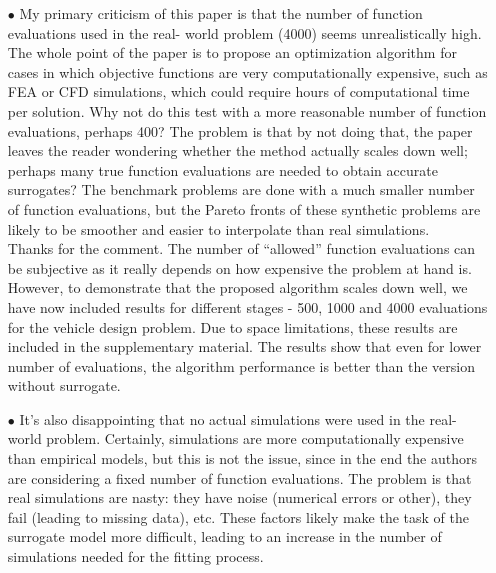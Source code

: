 \documentclass[onecolumn,10pt]{asme2ej}
\begin{document}
\begin{itemize}

\item[$\bullet$]	My primary criticism of this paper is that the number of function evaluations used in the real- world problem (4000) seems unrealistically high. The whole point of the paper is to propose an optimization algorithm for cases in which objective functions are very computationally expensive, such as FEA or CFD simulations, which could require hours of computational time per solution. Why not do this test with a more reasonable number of function evaluations, perhaps 400? The problem is that by not doing that, the paper leaves the reader wondering whether the method actually scales down well; perhaps many true function evaluations are needed to obtain accurate surrogates? The benchmark problems are done with a much smaller number of function evaluations, but the Pareto fronts of these synthetic problems are likely to be smoother and easier to interpolate than real simulations. \\

{\color{blue} Thanks for the comment. The number of ``allowed'' function evaluations  can be subjective as it really depends on how expensive the problem at hand is. However, to demonstrate that the proposed algorithm scales down well, we have now included results for different stages - 500, 1000 and 4000 evaluations for the vehicle design problem. Due to space limitations, these results are included in the supplementary material. The results show that even for lower number of evaluations, the algorithm performance is better than the version without surrogate. 
} \\


\item[$\bullet$]	It’s also disappointing that no actual simulations were used in the real-world problem. Certainly, simulations are more computationally expensive than empirical models, but this is not the issue, since in the end the authors are considering a fixed number of function evaluations. The problem is that real simulations are nasty: they have noise (numerical errors or other), they fail (leading to missing data), etc. These factors likely make the task of the surrogate model more difficult, leading to an increase in the number of simulations needed for the fitting process. \\


\end{itemize}
\end{document}
